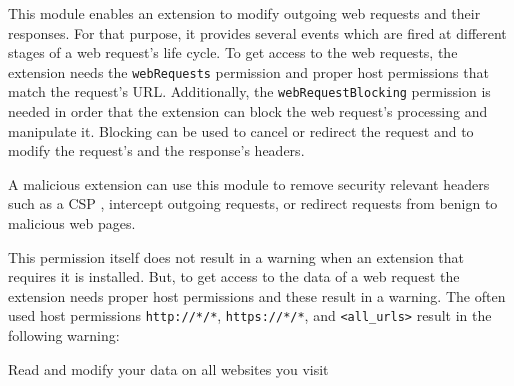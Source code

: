 	This module enables an extension to modify outgoing web requests and their responses. For that purpose, it provides several events which are fired at different stages of a web request's life cycle. To get access to the web requests, the extension needs the \texttt{webRequests} permission and proper host permissions that match the request's URL. Additionally, the \texttt{webRequestBlocking} permission is needed in order that the extension can block the web request's processing and manipulate it. Blocking can be used to cancel or redirect the request and to modify the request's and the response's headers. 
	
	A malicious extension can use this module to remove security relevant headers such as a CSP , intercept outgoing requests, or redirect requests from benign to malicious web pages.
	
	This permission itself does not result in a warning when an extension that requires it is installed. But, to get access to the data of a web request the extension needs proper host permissions and these result in a warning. The often used host permissions \texttt{http://*/*}, \texttt{https://*/*}, and \texttt{<all\_urls>} result in the following warning:
	\begin{permissionwarning}
		Read and modify your data on all websites you visit 
	\end{permissionwarning}
	
	
		
	

